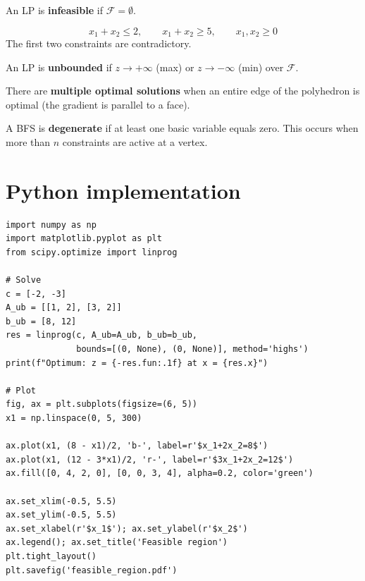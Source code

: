 \begin{definition}
An LP is \textbf{infeasible} if $\mathcal{F} = \emptyset$.
\end{definition}

\begin{example}[Infeasibility]
\[
  x_1 + x_2 \le 2, \qquad x_1 + x_2 \ge 5, \qquad x_1, x_2 \ge 0
\]
The first two constraints are contradictory.
\end{example}

\begin{definition}
An LP is \textbf{unbounded} if $z \to +\infty$ (max) or $z \to -\infty$
(min) over $\mathcal{F}$.
\end{definition}

\begin{definition}
There are \textbf{multiple optimal solutions} when an entire edge of the
polyhedron is optimal (the gradient is parallel to a face).
\end{definition}

\begin{definition}[Degeneracy]
A BFS is \textbf{degenerate} if at least one basic variable equals zero.
This occurs when more than $n$ constraints are active at a vertex.
\end{definition}

\section{Python implementation}

\begin{codeblock}[title=\textbf{Visualizing the feasible region}]
\begin{verbatim}
import numpy as np
import matplotlib.pyplot as plt
from scipy.optimize import linprog

# Solve
c = [-2, -3]
A_ub = [[1, 2], [3, 2]]
b_ub = [8, 12]
res = linprog(c, A_ub=A_ub, b_ub=b_ub,
              bounds=[(0, None), (0, None)], method='highs')
print(f"Optimum: z = {-res.fun:.1f} at x = {res.x}")

# Plot
fig, ax = plt.subplots(figsize=(6, 5))
x1 = np.linspace(0, 5, 300)

ax.plot(x1, (8 - x1)/2, 'b-', label=r'$x_1+2x_2=8$')
ax.plot(x1, (12 - 3*x1)/2, 'r-', label=r'$3x_1+2x_2=12$')
ax.fill([0, 4, 2, 0], [0, 0, 3, 4], alpha=0.2, color='green')

ax.set_xlim(-0.5, 5.5)
ax.set_ylim(-0.5, 5.5)
ax.set_xlabel(r'$x_1$'); ax.set_ylabel(r'$x_2$')
ax.legend(); ax.set_title('Feasible region')
plt.tight_layout()
plt.savefig('feasible_region.pdf')
\end{verbatim}
\end{codeblock}

